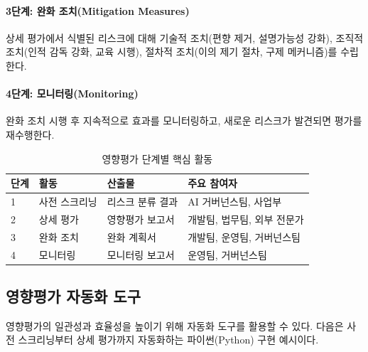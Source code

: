 \paragraph{3단계: 완화 조치(Mitigation Measures)}
상세 평가에서 식별된 리스크에 대해 기술적 조치(편향 제거, 설명가능성 강화), 조직적 조치(인적 감독 강화, 교육 시행), 절차적 조치(이의 제기 절차, 구제 메커니즘)를 수립한다.

\paragraph{4단계: 모니터링(Monitoring)}
완화 조치 시행 후 지속적으로 효과를 모니터링하고, 새로운 리스크가 발견되면 평가를 재수행한다.

\begin{table}[htbp]
\centering
\caption{영향평가 단계별 핵심 활동}
\label{tab:ia_stages}
\begin{tabularx}{\textwidth}{p{1cm}p{2.5cm}p{2.5cm}X}
\toprule
\textbf{단계} & \textbf{활동} & \textbf{산출물} & \textbf{주요 참여자} \\
\midrule
1 & 사전 스크리닝 & 리스크 분류 결과 & AI 거버넌스팀, 사업부 \\
2 & 상세 평가 & 영향평가 보고서 & 개발팀, 법무팀, 외부 전문가 \\
3 & 완화 조치 & 완화 계획서 & 개발팀, 운영팀, 거버넌스팀 \\
4 & 모니터링 & 모니터링 보고서 & 운영팀, 거버넌스팀 \\
\bottomrule
\end{tabularx}
\end{table}

\subsection{영향평가 자동화 도구}
\label{sec:5.2.4}

영향평가의 일관성과 효율성을 높이기 위해 자동화 도구를 활용할 수 있다. 다음은 사전 스크리닝부터 상세 평가까지 자동화하는 파이썬(Python) 구현 예시이다.

